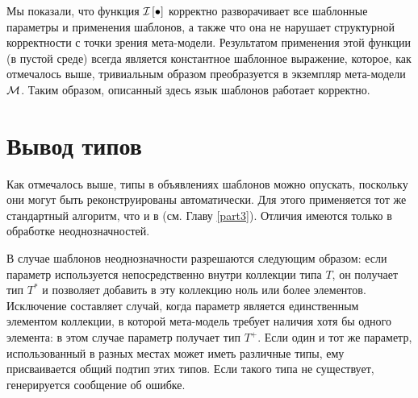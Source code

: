 Мы показали, что функция $\mathcal{I}_{} \left[ \bullet \right]$ корректно разворачивает все шаблонные параметры и применения шаблонов, а также что она не нарушает структурной корректности с точки зрения мета-модели. Результатом применения этой функции (в пустой среде) всегда является константное шаблонное выражение, которое, как отмечалось выше, тривиальным образом преобразуется в экземпляр мета-модели $\mathcal{M}$. Таким образом, описанный здесь язык шаблонов работает корректно.

\section{Вывод типов}

Как отмечалось выше, типы в объявлениях шаблонов можно опускать, поскольку они могут быть реконструированы автоматически. Для этого применяется тот же стандартный алгоритм, что и в \ATF{} (см. Главу \ref{part3}). Отличия имеются только в обработке неоднозначностей.

В случае шаблонов неоднозначности разрешаются следующим образом: если параметр используется непосредственно внутри коллекции типа $T$, он получает тип $T^*$ и позволяет добавить в эту коллекцию ноль или более элементов. Исключение составляет случай, когда параметр является единственным элементом коллекции, в которой мета-модель требует наличия хотя бы одного элемента: в этом случае параметр получает тип $T^+$. Если один и тот же параметр, использованный в разных местах может иметь различные типы, ему присваивается общий подтип этих типов. Если такого типа не существует, генерируется сообщение об ошибке.